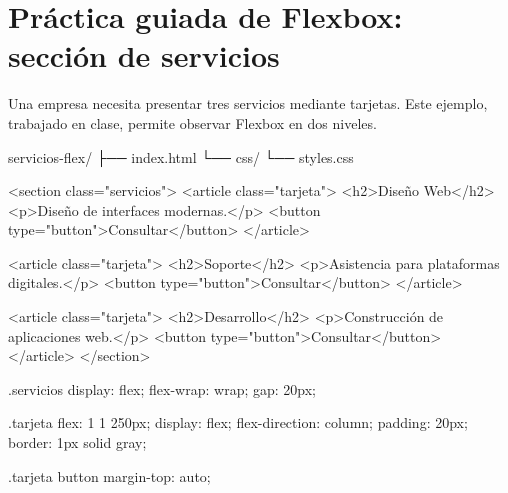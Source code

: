 \documentclass[11pt]{article}
\begin{document}



    \section{Práctica guiada de Flexbox: sección de servicios}

    Una empresa necesita presentar tres servicios mediante tarjetas. Este ejemplo,
    trabajado en clase, permite observar Flexbox en dos niveles.

    \begin{consolecode}
        servicios-flex/
        ├── index.html
        └── css/
            └── styles.css
    \end{consolecode}

    \begin{htmlcodedark}
        <section class="servicios">
        <article class="tarjeta">
        <h2>Diseño Web</h2>
        <p>Diseño de interfaces modernas.</p>
        <button type="button">Consultar</button>
        </article>

        <article class="tarjeta">
        <h2>Soporte</h2>
        <p>Asistencia para plataformas digitales.</p>
        <button type="button">Consultar</button>
        </article>

        <article class="tarjeta">
        <h2>Desarrollo</h2>
        <p>Construcción de aplicaciones web.</p>
        <button type="button">Consultar</button>
        </article>
        </section>
    \end{htmlcodedark}

    \begin{csscodedark}
        .servicios {
            display: flex;
            flex-wrap: wrap;
            gap: 20px;
        }

        .tarjeta {
            flex: 1 1 250px;
            display: flex;
            flex-direction: column;
            padding: 20px;
            border: 1px solid gray;
        }

        .tarjeta button {
            margin-top: auto;
        }
    \end{csscodedark}
\end{document}
